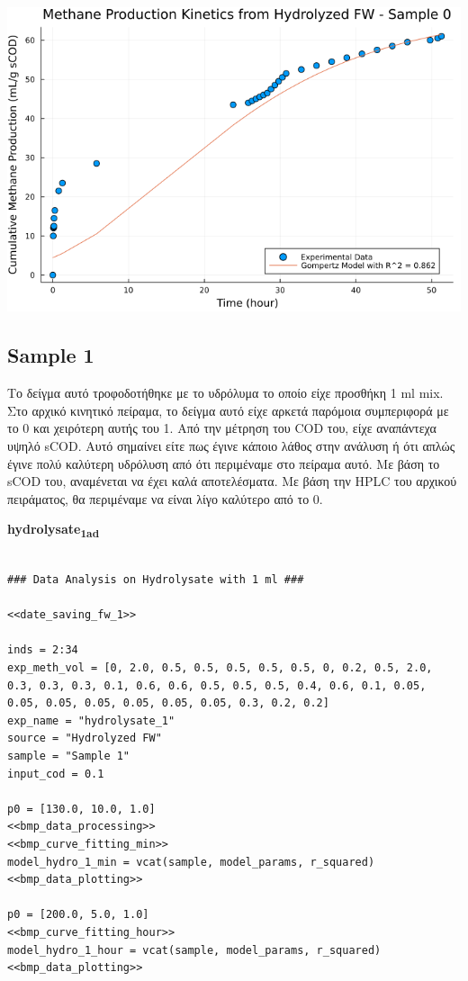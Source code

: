 \documentclass[11pt]{article}
\begin{document}
\begin{center}
\includegraphics[width=.9\linewidth]{../plots/BMPs/Hydrolyzed FW/methane_kinetics_hydrolysate_0_hour.png}
\end{center}

\subsection{Sample 1}
\label{sec:org8133c1c}
Το δείγμα αυτό τροφοδοτήθηκε με το υδρόλυμα το οποίο είχε προσθήκη 1 ml mix. Στο αρχικό κινητικό πείραμα, το δείγμα αυτό είχε αρκετά παρόμοια συμπεριφορά με το 0 και χειρότερη αυτής του 1. Από την μέτρηση του COD του, είχε αναπάντεχα υψηλό sCOD. Αυτό σημαίνει είτε πως έγινε κάποιο λάθος στην ανάλυση ή ότι απλώς έγινε πολύ καλύτερη υδρόλυση από ότι περιμέναμε στο πείραμα αυτό. Με βάση το sCOD του, αναμένεται να έχει καλά αποτελέσματα. Με βάση την HPLC του αρχικού πειράματος, θα περιμέναμε να είναι λίγο καλύτερο από το 0.

\textbf{hydrolysate\textsubscript{1}\textsubscript{ad}}
\begin{verbatim}

### Data Analysis on Hydrolysate with 1 ml ###

<<date_saving_fw_1>>

inds = 2:34
exp_meth_vol = [0, 2.0, 0.5, 0.5, 0.5, 0.5, 0.5, 0, 0.2, 0.5, 2.0, 0.3, 0.3, 0.3, 0.1, 0.6, 0.6, 0.5, 0.5, 0.5, 0.4, 0.6, 0.1, 0.05, 0.05, 0.05, 0.05, 0.05, 0.05, 0.05, 0.3, 0.2, 0.2]
exp_name = "hydrolysate_1"
source = "Hydrolyzed FW"
sample = "Sample 1"
input_cod = 0.1

p0 = [130.0, 10.0, 1.0]
<<bmp_data_processing>>
<<bmp_curve_fitting_min>>
model_hydro_1_min = vcat(sample, model_params, r_squared)
<<bmp_data_plotting>>

p0 = [200.0, 5.0, 1.0]
<<bmp_curve_fitting_hour>>
model_hydro_1_hour = vcat(sample, model_params, r_squared)
<<bmp_data_plotting>>
\end{verbatim}
\end{document}
